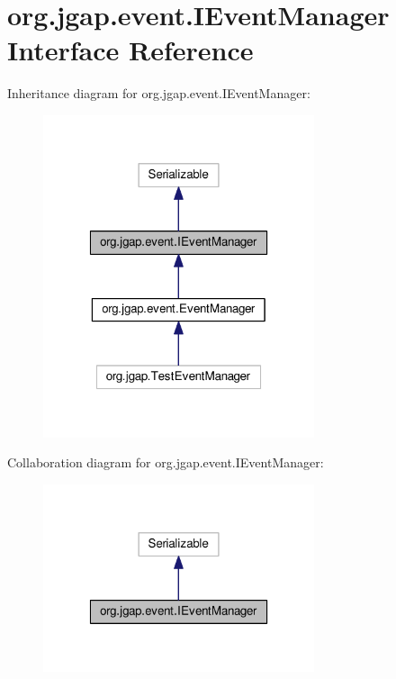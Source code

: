 \hypertarget{interfaceorg_1_1jgap_1_1event_1_1_i_event_manager}{\section{org.\-jgap.\-event.\-I\-Event\-Manager Interface Reference}
\label{interfaceorg_1_1jgap_1_1event_1_1_i_event_manager}
}


Inheritance diagram for org.\-jgap.\-event.\-I\-Event\-Manager\-:
\nopagebreak
\begin{figure}[H]
\begin{center}
\leavevmode
\includegraphics[width=226pt]{interfaceorg_1_1jgap_1_1event_1_1_i_event_manager__inherit__graph}
\end{center}
\end{figure}


Collaboration diagram for org.\-jgap.\-event.\-I\-Event\-Manager\-:
\nopagebreak
\begin{figure}[H]
\begin{center}
\leavevmode
\includegraphics[width=226pt]{interfaceorg_1_1jgap_1_1event_1_1_i_event_manager__coll__graph}
\end{center}
\end{figure}
